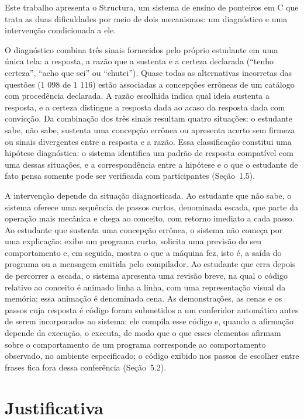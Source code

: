 Este trabalho apresenta o Structura, um sistema de ensino de ponteiros em C que trata as duas dificuldades por meio de dois mecanismos: um diagnóstico e uma intervenção condicionada a ele.

O diagnóstico combina três sinais fornecidos pelo próprio estudante em uma única tela: a resposta, a razão que a sustenta e a certeza declarada (``tenho certeza'', ``acho que sei'' ou ``chutei''). Quase todas as alternativas incorretas das questões (1 098 de 1 116) estão associadas a concepções errôneas de um catálogo com procedência declarada. A razão escolhida indica qual ideia sustenta a resposta, e a certeza distingue a resposta dada ao acaso da resposta dada com convicção. Da combinação dos três sinais resultam quatro situações: o estudante sabe, não sabe, sustenta uma concepção errônea ou apresenta acerto sem firmeza ou sinais divergentes entre a resposta e a razão. Essa classificação constitui uma hipótese diagnóstica: o sistema identifica um padrão de resposta compatível com uma dessas situações, e a correspondência entre a hipótese e o que o estudante de fato pensa somente pode ser verificada com participantes (Seção~1.5).

A intervenção depende da situação diagnosticada. Ao estudante que não sabe, o sistema oferece uma sequência de passos curtos, denominada escada, que parte da operação mais mecânica e chega ao conceito, com retorno imediato a cada passo. Ao estudante que sustenta uma concepção errônea, o sistema não começa por uma explicação: exibe um programa curto, solicita uma previsão do seu comportamento e, em seguida, mostra o que a máquina fez, isto é, a saída do programa ou a mensagem emitida pelo compilador. Ao estudante que erra depois de percorrer a escada, o sistema apresenta uma revisão breve, na qual o código relativo ao conceito é animado linha a linha, com uma representação visual da memória; essa animação é denominada cena. As demonstrações, as cenas e os passos cuja resposta é código foram submetidos a um conferidor automático antes de serem incorporados ao sistema: ele compila esse código e, quando a afirmação depende da execução, o executa, de modo que o que esses elementos afirmam sobre o comportamento de um programa corresponde ao comportamento observado, no ambiente especificado; o código exibido nos passos de escolher entre frases fica fora dessa conferência (Seção~5.2).

\section{Justificativa}

